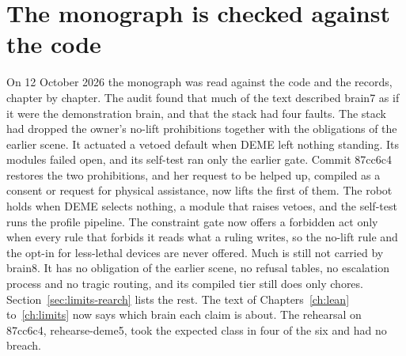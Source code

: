 \section{The monograph is checked against the code}\label{sec:log-audit}

On 12 October 2026 the monograph was read against the code and the records, chapter by chapter.
The audit found that much of the text described brain7 as if it were the demonstration brain, and
that the stack had four faults.
The stack had dropped the owner's no-lift prohibitions together with the obligations of the
earlier scene.
It actuated a vetoed default when DEME left nothing standing.
Its modules failed open, and its self-test ran only the earlier gate.
Commit 87cc6c4 restores the two prohibitions, and her request to be helped up, compiled as a
consent or request for physical assistance, now lifts the first of them.
The robot holds when DEME selects nothing, a module that raises vetoes, and the self-test runs the
profile pipeline.
The constraint gate now offers a forbidden act only when every rule that forbids it reads what a
ruling writes, so the no-lift rule and the opt-in for less-lethal devices are never offered.
Much is still not carried by brain8.
It has no obligation of the earlier scene, no refusal tables, no escalation process and no tragic
routing, and its compiled tier still does only chores.
Section~\ref{sec:limits-rearch} lists the rest.
The text of Chapters~\ref{ch:lean} to~\ref{ch:limits} now says which brain each claim is about.
The rehearsal on 87cc6c4, rehearse-deme5, took the expected class in four of the six and had no breach.


